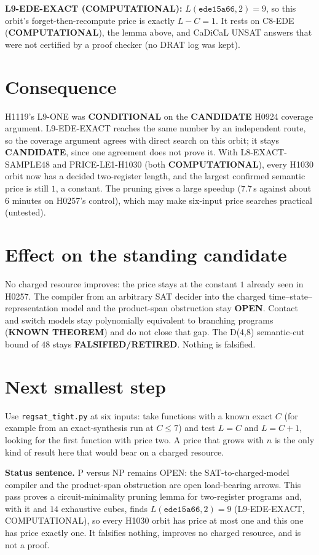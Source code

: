 \documentclass[11pt]{article}
\begin{document}
\textbf{L9-EDE-EXACT (COMPUTATIONAL):} $L(\texttt{ede15a66},2)=9$, so this orbit's forget-then-recompute price is exactly $L-C=1$. It rests on C8-EDE (\textbf{COMPUTATIONAL}), the lemma above, and CaDiCaL UNSAT answers that were not certified by a proof checker (no DRAT log was kept).

\section*{Consequence}
H1119's L9-ONE was \textbf{CONDITIONAL} on the \textbf{CANDIDATE} H0924 coverage argument. L9-EDE-EXACT reaches the same number by an independent route, so the coverage argument agrees with direct search on this orbit; it stays \textbf{CANDIDATE}, since one agreement does not prove it. With L8-EXACT-SAMPLE48 and PRICE-LE1-H1030 (both \textbf{COMPUTATIONAL}), every H1030 orbit now has a decided two-register length, and the largest confirmed semantic price is still $1$, a constant. The pruning gives a large speedup ($7.7$\,s against about $6$ minutes on H0257's control), which may make six-input price searches practical (untested).

\section*{Effect on the standing candidate}
No charged resource improves: the price stays at the constant $1$ already seen in H0257. The compiler from an arbitrary SAT decider into the charged time--state--representation model and the product-span obstruction stay \textbf{OPEN}. Contact and switch models stay polynomially equivalent to branching programs (\textbf{KNOWN THEOREM}) and do not close that gap. The D(4,8) semantic-cut bound of $48$ stays \textbf{FALSIFIED/RETIRED}. Nothing is falsified.

\section*{Next smallest step}
Use \texttt{regsat\_tight.py} at six inputs: take functions with a known exact $C$ (for example from an exact-synthesis run at $C\le7$) and test $L=C$ and $L=C+1$, looking for the first function with price two. A price that grows with $n$ is the only kind of result here that would bear on a charged resource.

\bigskip
\noindent\textbf{Status sentence.} P versus NP remains OPEN: the SAT-to-charged-model compiler and the product-span obstruction are open load-bearing arrows. This pass proves a circuit-minimality pruning lemma for two-register programs and, with it and $14$ exhaustive cubes, finds $L(\texttt{ede15a66},2)=9$ (L9-EDE-EXACT, COMPUTATIONAL), so every H1030 orbit has price at most one and this one has price exactly one. It falsifies nothing, improves no charged resource, and is not a proof.
\end{document}
